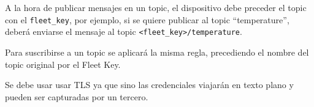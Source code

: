 A la hora de publicar mensajes en un topic, el dispositivo debe preceder el
topic con el \texttt{fleet\_key}, por ejemplo, si se quiere publicar al topic
``temperature'', deberá enviarse el mensaje al topic \texttt{<fleet\_key>/temperature}.

Para suscribirse a un topic se aplicará la misma regla, precediendo el nombre
del topic original por el Fleet Key.

Se debe usar usar TLS ya que sino las credenciales viajarán en texto plano y
pueden ser capturadas por un tercero.
